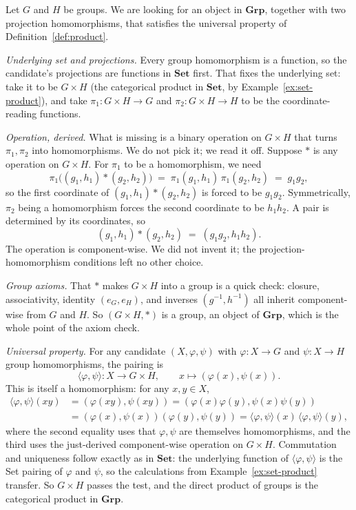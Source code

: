\begin{example}\label{ex:grp-product}
Let $G$ and $H$ be groups. We are looking for an object in
$\mathbf{Grp}$, together with two projection homomorphisms, that
satisfies the universal property of
Definition~\ref{def:product}.

\textit{Underlying set and projections.} Every group homomorphism is
a function, so the candidate's projections are functions in
$\mathbf{Set}$ first. That fixes the underlying set: take it to be
$G \times H$ (the categorical product in $\mathbf{Set}$, by
Example~\ref{ex:set-product}), and take $\pi_1 : G \times H \to G$ and
$\pi_2 : G \times H \to H$ to be the coordinate-reading functions.

\textit{Operation, derived.} What is missing is a binary operation on
$G \times H$ that turns $\pi_1, \pi_2$ into homomorphisms. We do not
pick it; we read it off. Suppose $*$ is any operation on $G \times H$.
For $\pi_1$ to be a homomorphism, we need
\[ \pi_1\bigl((g_1, h_1) * (g_2, h_2)\bigr) \; = \; \pi_1(g_1, h_1) \,
   \pi_1(g_2, h_2) \; = \; g_1 g_2, \]
so the first coordinate of $(g_1, h_1) * (g_2, h_2)$ is forced to be
$g_1 g_2$. Symmetrically, $\pi_2$ being a homomorphism forces the
second coordinate to be $h_1 h_2$. A pair is determined by its
coordinates, so
\[ (g_1, h_1) * (g_2, h_2) \; = \; (g_1 g_2, h_1 h_2). \]
The operation is component-wise. We did not invent it; the
projection-homomorphism conditions left no other choice.

\textit{Group axioms.} That $*$ makes $G \times H$ into a group is a
quick check: closure, associativity, identity $(e_G, e_H)$, and inverses
$(g^{-1}, h^{-1})$ all inherit component-wise from $G$ and $H$. So
$(G \times H, *)$ is a group, an object of $\mathbf{Grp}$, which is the
whole point of the axiom check.

\textit{Universal property.} For any candidate $(X, \varphi, \psi)$
with $\varphi : X \to G$ and $\psi : X \to H$ group homomorphisms, the
pairing is
\[ \langle \varphi, \psi \rangle : X \to G \times H, \qquad x \mapsto
(\varphi(x), \psi(x)). \]
This is itself a homomorphism: for any $x, y \in X$,
\begin{align*}
\langle \varphi, \psi \rangle (xy)
   & = (\varphi(xy), \psi(xy))
     = (\varphi(x) \varphi(y), \psi(x) \psi(y)) \\
   & = (\varphi(x), \psi(x))(\varphi(y), \psi(y))
     = \langle \varphi, \psi \rangle(x) \, \langle \varphi, \psi
\rangle(y),
\end{align*}
where the second equality uses that $\varphi, \psi$ are themselves
homomorphisms, and the third uses the just-derived component-wise
operation on $G \times H$. Commutation and uniqueness follow exactly
as in $\mathbf{Set}$: the underlying function of $\langle \varphi, \psi
\rangle$ is the Set pairing of $\varphi$ and $\psi$, so the
calculations from Example~\ref{ex:set-product} transfer. So $G \times
H$ passes the test, and the direct product of groups is the
categorical product in $\mathbf{Grp}$.
\end{example}

